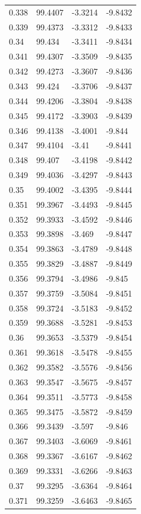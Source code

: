 \begin{tabular}{llll}
0.338 & 99.4407 & -3.3214 & -9.8432 \\
0.339 & 99.4373 & -3.3312 & -9.8433 \\
0.34 & 99.434 & -3.3411 & -9.8434 \\
0.341 & 99.4307 & -3.3509 & -9.8435 \\
0.342 & 99.4273 & -3.3607 & -9.8436 \\
0.343 & 99.424 & -3.3706 & -9.8437 \\
0.344 & 99.4206 & -3.3804 & -9.8438 \\
0.345 & 99.4172 & -3.3903 & -9.8439 \\
0.346 & 99.4138 & -3.4001 & -9.844 \\
0.347 & 99.4104 & -3.41 & -9.8441 \\
0.348 & 99.407 & -3.4198 & -9.8442 \\
0.349 & 99.4036 & -3.4297 & -9.8443 \\
0.35 & 99.4002 & -3.4395 & -9.8444 \\
0.351 & 99.3967 & -3.4493 & -9.8445 \\
0.352 & 99.3933 & -3.4592 & -9.8446 \\
0.353 & 99.3898 & -3.469 & -9.8447 \\
0.354 & 99.3863 & -3.4789 & -9.8448 \\
0.355 & 99.3829 & -3.4887 & -9.8449 \\
0.356 & 99.3794 & -3.4986 & -9.845 \\
0.357 & 99.3759 & -3.5084 & -9.8451 \\
0.358 & 99.3724 & -3.5183 & -9.8452 \\
0.359 & 99.3688 & -3.5281 & -9.8453 \\
0.36 & 99.3653 & -3.5379 & -9.8454 \\
0.361 & 99.3618 & -3.5478 & -9.8455 \\
0.362 & 99.3582 & -3.5576 & -9.8456 \\
0.363 & 99.3547 & -3.5675 & -9.8457 \\
0.364 & 99.3511 & -3.5773 & -9.8458 \\
0.365 & 99.3475 & -3.5872 & -9.8459 \\
0.366 & 99.3439 & -3.597 & -9.846 \\
0.367 & 99.3403 & -3.6069 & -9.8461 \\
0.368 & 99.3367 & -3.6167 & -9.8462 \\
0.369 & 99.3331 & -3.6266 & -9.8463 \\
0.37 & 99.3295 & -3.6364 & -9.8464 \\
0.371 & 99.3259 & -3.6463 & -9.8465 \\

\end{tabular}
